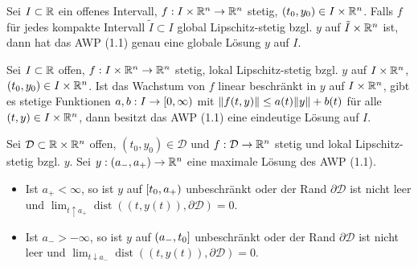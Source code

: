 \documentclass{cheat-sheet}
\newcommand{\D}{\mathcal{D}}
\DeclareMathOperator{\dist}{dist} %
\begin{document}

\begin{satz}
  Sei $I \subset \mathbb{R}$ ein offenes Intervall, $f : I \times \mathbb{R}^n \to \mathbb{R}^n$ stetig, $(t_0, y_0) \in I \times \mathbb{R}^n$. Falls $f$ für jedes kompakte Intervall $\tilde{I} \subset I$ global Lipschitz-stetig bzgl. $y$ auf $\tilde{I} \times \mathbb{R}^n$ ist, dann hat das AWP (1.1) genau eine globale Lösung $y$ auf $I$.
\end{satz}

\begin{satz}
  Sei $I \subset \mathbb{R}$ offen, $f : I \times \mathbb{R}^n \to \mathbb{R}^n$ stetig, lokal Lipschitz-stetig bzgl. $y$ auf $I \times \mathbb{R}^n$, $(t_0, y_0) \in I \times \mathbb{R}^n$. Ist das Wachstum von $f$ linear beschränkt in $y$ auf $I \times \mathbb{R}^n$, \dh{} gibt es stetige Funktionen $a, b : I \to \left[ 0, \infty \right)$ mit $\lVert f(t, y)\rVert \leq a(t) \lVert y\rVert + b(t)$ für alle $(t, y) \in I \times \mathbb{R}^n$, dann besitzt das AWP (1.1) eine eindeutige Lösung auf $I$.
\end{satz}



\begin{satz}
  Sei $\D \subset \R \times \R^n$ offen, $(t_0, y_0) \in \D$ und $f : \D \to \R^n$ stetig und lokal Lipschitz-stetig bzgl. $y$. Sei $y : \left( a_-, a_+ \right) \to \mathbb{R}^n$ eine maximale Lösung des AWP (1.1).
  \begin{itemize}
    \item Ist $a_+ < \infty$, so ist $y$ auf $\left[ t_0, a_+ \right)$ unbeschränkt
    oder der Rand $\partial \D$ ist nicht
    leer und $\lim_{t \uparrow a_+} \dist((t, y(t)), \partial \D) = 0$.
    \item Ist $a_- > -\infty$, so ist $y$ auf $\left( a_-, t_0 \right]$ unbeschränkt oder der Rand $\partial \D$ ist nicht leer und $\lim_{t \downarrow a_-} \dist((t, y(t)), \partial \D) = 0$.
  \end{itemize}
\end{satz}

\end{document}
